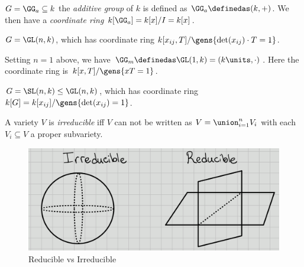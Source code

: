 \begin{example}

\(G = \GG_a \subseteq k\) the \emph{additive group} of \(k\) is defined
as \(\GG_a \definedas (k, +)\). We then have a \emph{coordinate ring}
\(k[\GG_a] = k[x] / I = k[x]\).

\end{example}

\begin{example}

\(G = \GL(n, k)\), which has coordinate ring
\(k[x_{ij}, T] / \gens{\det(x_{ij})\cdot T = 1}\).

\end{example}

\begin{example}

Setting \(n=1\) above, we have
\(\GG_m \definedas \GL(1, k) = (k\units, \cdot)\). Here the coordinate
ring is \(k[x, T] / \gens{xT = 1}\).

\end{example}

\begin{example}

\(G = \SL(n, k) \leq \GL(n, k)\), which has coordinate ring
\(k[G] = k[x_{ij}] / \gens{\det(x_{ij}) = 1}\).

\end{example}

\begin{definition}[Irreducible]

A variety \(V\) is \emph{irreducible} iff \(V\) can not be written as
\(V = \union_{i=1}^n V_i\) with each \(V_i \subseteq V\) a proper
subvariety.

\begin{figure}
\centering
\includegraphics{figures/Reducible_v_irreducible.png}
\caption{Reducible vs Irreducible}
\end{figure}

\end{definition}

